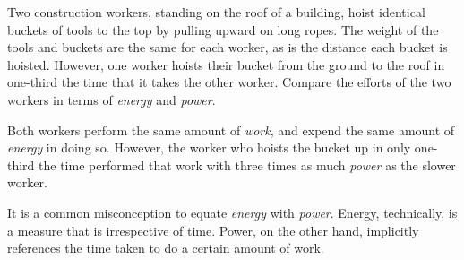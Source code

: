 

Two construction workers, standing on the roof of a building, hoist identical buckets of tools to the top by pulling upward on long ropes.  The weight of the tools and buckets are the same for each worker, as is the distance each bucket is hoisted.  However, one worker hoists their bucket from the ground to the roof in one-third the time that it takes the other worker.  Compare the efforts of the two workers in terms of {\it energy} and {\it power}.







Both workers perform the same amount of {\it work}, and expend the same amount of {\it energy} in doing so.  However, the worker who hoists the bucket up in only one-third the time performed that work with three times as much {\it power} as the slower worker.







It is a common misconception to equate {\it energy} with {\it power}.  Energy, technically, is a measure that is irrespective of time.  Power, on the other hand, implicitly references the time taken to do a certain amount of work.




